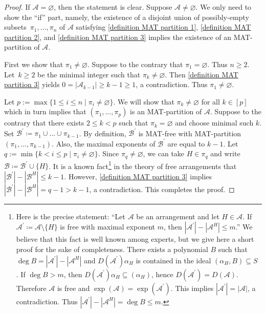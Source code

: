 \documentclass[ALCO, Unicode,published]{cedram}
\newcommand{\A}{\mathcal{A}}
\begin{document}
\begin{proof}
If $ \A = \varnothing $, then the statement is clear. Suppose $ \A \ne \varnothing $. 
We only need to show the ``if'' part, namely, the existence of a disjoint union of  possibly-empty subsets~$ \pi_{1}, \dots, \pi_{n} $ of $ \mathcal{A} $ satisfying \ref{definition MAT partition 1}, \ref{definition MAT partition 2}, and \ref{definition MAT partition 3} implies the existence of an MAT-partition of $\A$.

First we show that $ \pi_{1} \neq \varnothing $. 
Suppose to the contrary that $ \pi_{1} = \varnothing $. 
Thus $n\ge2$.
Let~$ k \geq 2 $ be the minimal integer such that $ \pi_{k} \neq \varnothing $. 
Then \ref{definition MAT partition 3} yields $ 0 = |\mathcal{A}_{k-1}| \geq k-1 \geq 1 $, a contradiction. 
Thus $ \pi_{1} \neq \varnothing $. 

Let $p:= \max \{ 1 \le i\le n \mid \pi_i \ne\varnothing \}$.
We will show that  $\pi_{k} \neq \varnothing $ for all $ k \in [p] $ which in turn implies that $ (\pi_{1}, \dots, \pi_{p}) $ is an MAT-partition of $ \mathcal{A} $. 
Suppose to the contrary that there exists   $2\le  k< p$ such that $ \pi_{k} = \varnothing $ and choose minimal such $k$.
Set $ \mathcal{B}^{\prime} \coloneqq \pi_{1} \cup \dots \cup \pi_{k-1} $. 
By definition, $ \mathcal{B}^{\prime} $ is MAT-free with MAT-partition $ (\pi_{1}, \dots, \pi_{k-1}) $. 
Also, the maximal exponents of $ \mathcal{B}^{\prime} $ are equal to $ k-1 $. 
Let $q:= \min \{k<i \le p\mid \pi_i \ne\varnothing \}$.
Since $ \pi_{q} \neq \varnothing $, we can take $ H \in  \pi_{q}$ and write $ \mathcal{B} \coloneqq \mathcal{B}^{\prime} \cup \{H\} $. 
It is a known fact\footnote{Here is the precise statement: ``Let  $ \mathcal{A} $ be an arrangement and let $ H \in \mathcal{A} $. If $ \mathcal{A}^{\prime} \coloneqq \mathcal{A}\setminus\{H\} $ is free with maximal exponent $ m $, then $ |\mathcal{A}^{\prime}| - |\mathcal{A}^{H}| \leq m $.'' 
We believe that this fact is well known among experts, but we give here a short proof for the sake of completeness. 
There exists a polynomial $ B $ such that $ \deg B = |\mathcal{A}^{\prime}| - |\mathcal{A}^{H}| $ and $ D(\mathcal{A}^{\prime})\alpha_{H} $ is contained in the ideal $(\alpha_{H}, B) \subseteq S$ \cite[Lemma 4.39 and Proposition 4.41]{OT92}. 
If $ \deg B > m $, then $ D(\mathcal{A}^{\prime})\alpha_{H} \subseteq (\alpha_{H}) $, hence $ D(\mathcal{A}^{\prime}) = D(\mathcal{A}) $. 
Therefore $ \mathcal{A} $ is free and  $\exp (\mathcal{A} )=\exp (\mathcal{A}^{\prime} )$. 
This implies $ |\mathcal{A}^{\prime}| = |\mathcal{A}| $, a contradiction. 
Thus $ |\mathcal{A}^{\prime}| - |\mathcal{A}^{H}| = \deg B \leq m $.}
 in the theory of free arrangements that $ |\mathcal{B}^{\prime}| - |\mathcal{B}^{H}| \leq k-1$.
However, \ref{definition MAT partition 3} implies $ |\mathcal{B}^{\prime}| - |\mathcal{B}^{H}| = q-1 >k-1$, a contradiction. 
This completes the proof.
\end{proof}
\end{document}
